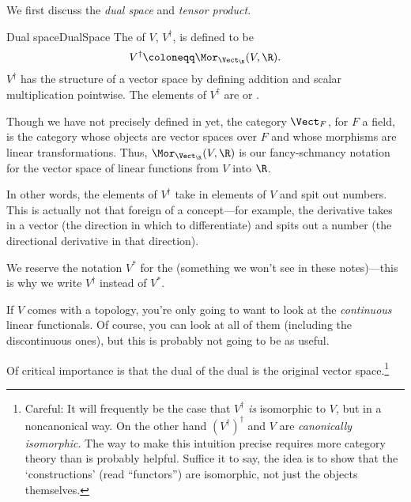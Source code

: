 We first discuss the \emph{dual space} and \emph{tensor product}.
\begin{dfn}{Dual space}{DualSpace}
The  of $V$, $V^{\dagger}$, is defined to be
\begin{equation}
V^{\dagger}\coloneqq \Mor _{\Vect _{\R}}(V,\R ).
\end{equation}
$V^{\dagger}$ has the structure of a vector space by defining addition and scalar multiplication pointwise.  The elements of $V^{\dagger}$ are  or .
\begin{rmk}
Though we have not precisely defined in yet, the category $\Vect _F$, for $F$ a field, is the category whose objects are vector spaces over $F$ and whose morphisms are linear transformations.  Thus, $\Mor _{\Vect _{\R}}(V,\R )$ is our fancy-schmancy notation for the vector space of linear functions from $V$ into $\R$.
\end{rmk}
\begin{rmk}
In other words, the elements of $V^{\dagger}$ take in elements of $V$ and spit out numbers.  This is actually not that foreign of a concept---for example, the derivative takes in a vector (the direction in which to differentiate) and spits out a number (the directional derivative in that direction).
\end{rmk}
\begin{rmk}
We reserve the notation $V^*$ for the  (something we won't see in these notes)---this is why we write $V^{\dagger}$ instead of $V^*$.
\end{rmk}
\begin{rmk}
If $V$ comes with a topology, you're only going to want to look at the \emph{continuous} linear functionals.  Of course, you can look at all of them (including the discontinuous ones), but this is probably not going to be as useful.
\end{rmk}
\end{dfn}
Of critical importance is that the dual of the dual is the original vector space.\footnote{Careful:  It will frequently be the case that $V^{\dagger}$ \emph{is} isomorphic to $V$, but in a noncanonical way.  On the other hand $(V^{\dagger})^{\dagger}$ and $V$ are \emph{canonically isomorphic}.  The way to make this intuition precise requires more category theory than is probably helpful.  Suffice it to say, the idea is to show that the `constructions' (read ``functors'') are isomorphic, not just the objects themselves.}
